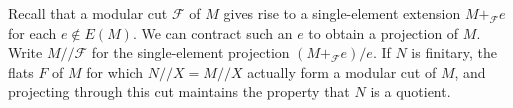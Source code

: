 \documentclass{amsart}
\theoremstyle{plain}
\theoremstyle{definition}
\newcommand{\cF}{\mathcal{F}}
\newcommand{\dcon}{/ \!\! /}
\newcommand{\con}{/}
\begin{document}


Recall that a modular cut $\cF$ of $M$ gives rise to a single-element extension $M +_{\cF} e$ for each $e \notin E(M)$. 
We can contract such an $e$ to obtain a projection of $M$. Write $M \dcon \cF$ for the single-element projection $(M +_{\cF} e) \con e$. 
If $N$ is finitary, the flats $F$ of $M$ for which $N \dcon X = M \dcon X$ actually form a modular cut of $M$, 
and projecting through this cut maintains the property that $N$ is a quotient. 
\end{document}
